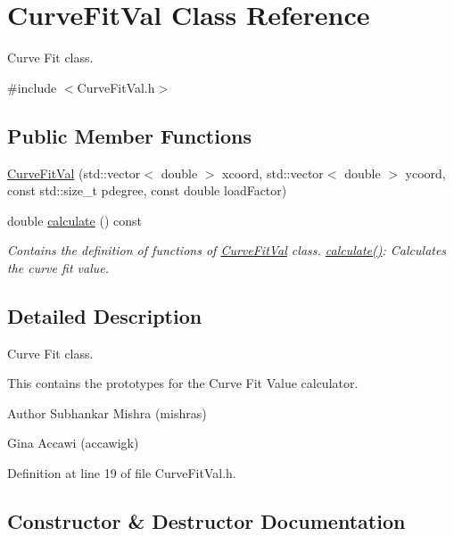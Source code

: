\hypertarget{class_curve_fit_val}{}\section{Curve\+Fit\+Val Class Reference}
\label{class_curve_fit_val}


Curve Fit class.  




{\ttfamily \#include $<$Curve\+Fit\+Val.\+h$>$}

\subsection*{Public Member Functions}
\begin{DoxyCompactItemize}
\item 
\hyperlink{class_curve_fit_val_ad58e4933db92ceb5b9a42276c398d034}{Curve\+Fit\+Val} (std\+::vector$<$ double $>$ xcoord, std\+::vector$<$ double $>$ ycoord, const std\+::size\+\_\+t pdegree, const double load\+Factor)
\item 
double \hyperlink{class_curve_fit_val_af928003c67aed9c644632a548be08713}{calculate} () const
\begin{DoxyCompactList}\small\item\em Contains the definition of functions of \hyperlink{class_curve_fit_val}{Curve\+Fit\+Val} class. \hyperlink{class_curve_fit_val_af928003c67aed9c644632a548be08713}{calculate()}\+: Calculates the curve fit value. \end{DoxyCompactList}\end{DoxyCompactItemize}


\subsection{Detailed Description}
Curve Fit class. 

This contains the prototypes for the Curve Fit Value calculator.

\begin{DoxyAuthor}{Author}
Subhankar Mishra (mishras) 

Gina Accawi (accawigk) 
\end{DoxyAuthor}


Definition at line 19 of file Curve\+Fit\+Val.\+h.



\subsection{Constructor \& Destructor Documentation}
\mbox{\label{class_curve_fit_val_ad58e4933db92ceb5b9a42276c398d034}} 
